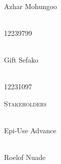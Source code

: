 \begin{titlepage}
\begin{center}
		
		\begin{minipage}{0.4\textwidth}
			\begin{flushleft} \large
				\emph{} \\
				Azhar {Mohungoo }
			\end{flushleft}
		\end{minipage}
		\begin{minipage}{0.4\textwidth}
			\begin{flushright} \large
				\emph{} \\
				12239799
			\end{flushright}
		\end{minipage}
		
		
		\begin{minipage}{0.4\textwidth}
			\begin{flushleft} \large
				\emph{} \\
				Gift {Sefako }
			\end{flushleft}
		\end{minipage}
		\begin{minipage}{0.4\textwidth}
			\begin{flushright} \large
				\emph{} \\
				12231097
			\end{flushright}
		\end{minipage}
		
		\textsc{\Large Stakeholders}\\[1cm]	
				
		\begin{minipage}{0.4\textwidth}
			\begin{flushleft} \large
				\emph{} \\
				Epi-Use Advance
			\end{flushleft}
		\end{minipage}
		\begin{minipage}{0.4\textwidth}
			\begin{flushright} \large
				\emph{} \\
				Roelof Nuade
			\end{flushright}
		\end{minipage}
		
	\end{center}
\end{titlepage}